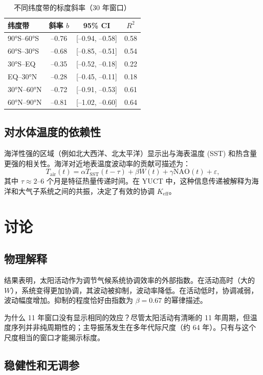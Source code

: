 \documentclass[12pt,a4paper]{article}
\newcommand{\Keff}{K_{\mathrm{eff}}}
\newcommand{\be}{\beta}
\begin{document}
	\begin{table}[htbp]
		\centering
		\caption{不同纬度带的标度斜率（30 年窗口）}
		\label{tab:zonal}
		\begin{tabular}{@{}lccc@{}}
			\toprule
			纬度带 & 斜率 \(b\) & 95\% CI & \(R^2\) \\
			\midrule
			90°S–60°S & –0.76 & [–0.94, –0.58] & 0.58 \\
			60°S–30°S & –0.68 & [–0.85, –0.51] & 0.54 \\
			30°S–EQ & –0.35 & [–0.52, –0.18] & 0.22 \\
			EQ–30°N & –0.28 & [–0.45, –0.11] & 0.18 \\
			30°N–60°N & –0.72 & [–0.91, –0.53] & 0.61 \\
			60°N–90°N & –0.81 & [–1.02, –0.60] & 0.64 \\
			\bottomrule
		\end{tabular}
	\end{table}
	
	\subsection{对水体温度的依赖性}
	
	海洋性强的区域（例如北大西洋、北太平洋）显示出与海表温度 (SST) 和热含量更强的相关性。海洋对近地表温度波动率的贡献可描述为：
	\[
	T_{\text{air}}(t) = \alpha T_{\text{SST}}(t-\tau) + \beta W(t) + \gamma \text{NAO}(t) + \varepsilon,
	\]
	其中 \(\tau \approx 2\)–6 个月是特征热量传递时间。在 YUCT 中，这种信息传递被解释为海洋和大气子系统之间的共振，决定了有效的协调 \(\Keff\)。
	
	\section{讨论}
	
	\subsection{物理解释}
	
	结果表明，太阳活动作为调节气候系统协调效率的外部指数。在活动高时（大的 \(W\)），系统变得更加协调，其波动被抑制，波动率降低。在活动低时，协调减弱，波动幅度增加。抑制的程度恰好由指数为 \(\be = 0.67\) 的幂律描述。
	
	为什么 11 年窗口没有显示相同的效应？尽管太阳活动有清晰的 11 年周期，但温度序列并非纯周期性的；主导振荡发生在多年代际尺度（约 64 年）。只有与这个尺度相当的窗口才能揭示标度。
	
	\subsection{稳健性和无调参}
	
\end{document}
